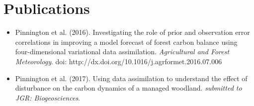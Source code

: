 \documentclass[11pt]{article}
\begin{document}
\section*{Publications}
\begin{itemize}
\item Pinnington et al. (2016). Investigating the role of prior and observation error correlations in improving a model
forecast of forest carbon balance using four-dimensional variational data assimilation. \textit{Agricultural and
Forest Meteorology}. doi: http://dx.doi.org/10.1016/j.agrformet.2016.07.006

\item Pinnington et al. (2017). Using data assimilation to understand the effect of disturbance on the carbon dynamics of a managed woodland. \textit{submitted to JGR: Biogeosciences}. 
\end{itemize}
\end{document}
